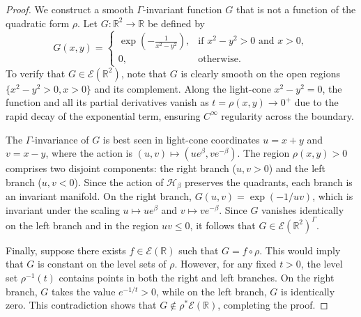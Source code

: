 \documentclass[10pt,a4paper]{amsart}
\begin{document}
\begin{proof}
	We construct a smooth $\Gamma$-invariant function $G$ that is not a function of the quadratic form $\rho$. Let $G: \mathbb{R}^2 \to \mathbb{R}$ be defined by
	\[
	G(x,y) =
	\begin{cases}
		\exp\left(-\frac{1}{x^2 - y^2}\right), & \text{if } x^2 - y^2 > 0 \text{ and } x > 0, \\0, & \text{otherwise}.\end{cases}
	\]
	To verify that $G \in \mathcal{E}(\mathbb{R}^2)$, note that $G$ is clearly smooth on the open regions $\{x^2 - y^2 > 0, x > 0\}$ and its complement. Along the light-cone $x^2 - y^2 = 0$, the function and all its partial derivatives vanish as $t = \rho(x,y) \to 0^+$ due to the rapid decay of the exponential term, ensuring $C^\infty$ regularity across the boundary.
	
	The $\Gamma$-invariance of $G$ is best seen in light-cone coordinates $u = x+y$ and $v = x-y$, where the action is $(u,v) \mapsto (ue^\beta, ve^{-\beta})$. The region $\rho(x,y) > 0$ comprises two disjoint components: the right branch ($u, v > 0$) and the left branch ($u, v < 0$). Since the action of $\mathcal{H}_\beta$ preserves the quadrants, each branch is an invariant manifold. On the right branch, $G(u,v) = \exp(-1/uv)$, which is invariant under the scaling $u \mapsto ue^\beta$ and $v \mapsto ve^{-\beta}$. Since $G$ vanishes identically on the left branch and in the region $uv \le 0$, it follows that $G \in \mathcal{E}(\mathbb{R}^2)^\Gamma$.
	
	Finally, suppose there exists $f \in \mathcal{E}(\mathbb{R})$ such that $G = f \circ \rho$. This would imply that $G$ is constant on the level sets of $\rho$. However, for any fixed $t > 0$, the level set $\rho^{-1}(t)$ contains points in both the right and left branches. On the right branch, $G$ takes the value $e^{-1/t} > 0$, while on the left branch, $G$ is identically zero. This contradiction shows that $G \notin \rho^*\mathcal{E}(\mathbb{R})$, completing the proof.
\end{proof}
\end{document}

